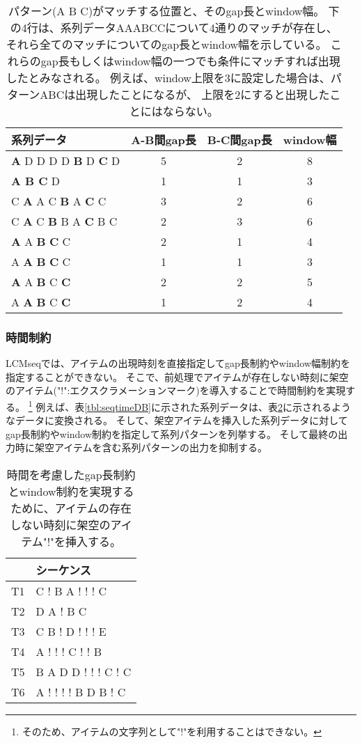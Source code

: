 \begin{table}[htbp]
\begin{center}
\caption{パターン(A B C)がマッチする位置と、そのgap長とwindow幅。
下の4行は、系列データAAABCCについて4通りのマッチが存在し、
それら全てのマッチについてのgap長とwindow幅を示している。
これらのgap長もしくはwindow幅の一つでも条件にマッチすれば出現したとみなされる。
例えば、window上限を3に設定した場合は、パターンABCは出現したことになるが、
上限を2にすると出現したことにはならない。
\label{tbl:gapwin}}
\begin{tabular}{lccc}
\hline
系列データ & A-B間gap長 & B-C間gap長 & window幅 \\
\hline
{\bf A} D D D D {\bf B} D {\bf C} D & 5 & 2 & 8 \\
{\bf A B C} D & 1 & 1 & 3 \\
C {\bf A} A C {\bf B} A {\bf C} C & 3 & 2 & 6\\
C {\bf A} C {\bf B} B A {\bf C} B C & 2 & 3 & 6\\
\hline
{\bf A} A {\bf B} {\bf C} C & 2 & 1 & 4\\
A {\bf A} {\bf B} {\bf C} C & 1 & 1 & 3\\
{\bf A} A {\bf B} C {\bf C} & 2 & 2 & 5\\
A {\bf A} {\bf B} C {\bf C} & 1 & 2 & 4\\
\hline
\end{tabular} 
\end{center}
\end{table} 

\subsubsection*{時間制約}
LCMseqでは、アイテムの出現時刻を直接指定してgap長制約やwindow幅制約を指定することができない。
そこで、前処理でアイテムが存在しない時刻に架空のアイテム("!":エクスクラメーションマーク)を導入することで時間制約を実現する。
\footnote{
そのため、アイテムの文字列として"!"を利用することはできない。
}
例えば、表\ref{tbl:seqtimeDB}に示された系列データは、表\ref{tbl:paddingDB}に示されるようなデータに変換される。
そして、架空アイテムを挿入した系列データに対してgap長制約やwindow制約を指定して系列パターンを列挙する。
そして最終の出力時に架空アイテムを含む系列パターンの出力を抑制する。

\begin{table}[htbp]
\begin{center}
\caption{時間を考慮したgap長制約とwindow制約を実現するために、アイテムの存在しない時刻に架空のアイテム"!"を挿入する。
\label{tbl:paddingDB}}
{\small
\begin{tabular}{cl}
\hline
  &シーケンス \\
\hline
T1&C ! B A ! ! ! C\\
T2&D A ! B C\\
T3&C B ! D ! ! ! E\\
T4&A ! ! ! C ! ! B\\
T5&B A D D ! ! ! C ! C\\
T6&A ! ! ! ! B D B ! C\\
\hline
\end{tabular} 
}
\end{center}
\end{table} 

